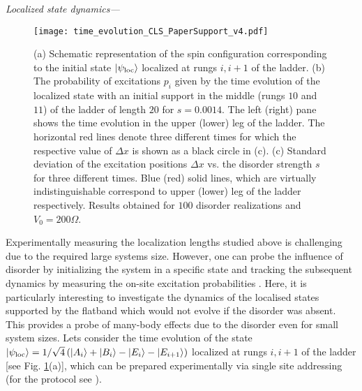 \documentclass[prl,aps,twocolumn,showpacs,superscriptaddress,longbibliography]{revtex4-1}
\newcommand{\lan}{\left\langle}
\newcommand{\ran}{\right\rangle}
\newcommand{\ket}[1]{\left| #1 \ran}
\newcommand{\bra}[1]{\lan #1 \right|}
\begin{document}
\emph{Localized state dynamics---}
\begin{figure}
\texttt{[image: time\_evolution\_CLS\_PaperSupport\_v4.pdf]}
\caption{(a) Schematic representation of the spin configuration corresponding to the initial state $\ket{\psi_{\rm loc}}$ localized at rungs $i,i+1$ of the ladder. (b) The probability of excitations $p_i$ given by the time evolution of the localized state with an initial support in the middle (rungs $10$ and $11$) of the ladder of length $20$ for $s=0.0014$. The left (right) pane shows the time evolution in the upper (lower) leg of the ladder. The horizontal red lines denote three different times for which the respective value of $\Delta x$ is shown as a black circle in (c). (c) Standard deviation of the excitation positions $\Delta x$ vs. the disorder strength $s$ for three different times. Blue (red) solid lines, which are virtually indistinguishable correspond to upper (lower) leg of the ladder respectively. Results obtained for $100$ disorder realizations and $V_0=200\Omega$.}
\label{Fig:time evolution}
\end{figure}
Experimentally measuring the localization lengths studied above is challenging due to the required large systems size. However, one can probe the influence of disorder by initializing the system in a specific state and tracking the subsequent dynamics by measuring the on-site excitation probabilities \cite{Schauss_2015,Labuhn_2015,Bernien2017}. Here, it is particularly interesting to investigate the dynamics of the localised states supported by the flatband which would not evolve if the disorder was absent. This provides a probe of many-body effects due to the disorder even for small system sizes. Lets consider the time evolution of the state $\ket{\psi_{\rm loc}} = 1/\sqrt{4} \left( \ket{A_i} + \ket{B_i} - \ket{E_i} - \ket{E_{i+1}} \right)$ localized at rungs $i,i+1$ of the ladder [see Fig. \ref{Fig:time evolution}(a)], which can be prepared experimentally via single site addressing (for the protocol see \cite{SM}).

\end{document}
